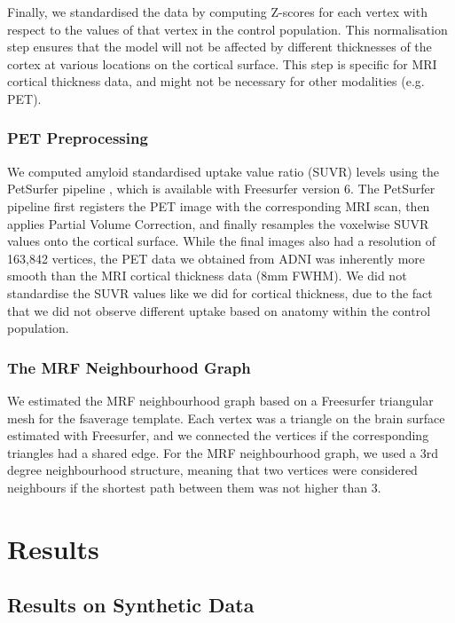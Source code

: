 Finally, we standardised the data by computing Z-scores for each vertex with respect to the values of that vertex in the control population. This normalisation step ensures that the model will not be affected by different thicknesses of the cortex at various locations on the cortical surface. This step is specific for MRI cortical thickness data, and might not be necessary for other modalities (e.g. PET). 

\subsubsection{PET Preprocessing}

We computed amyloid standardised uptake value ratio (SUVR) levels using the PetSurfer pipeline \cite{greve2014cortical,greve2016different}, which is available with Freesurfer version 6. The PetSurfer pipeline first registers the PET image with the corresponding MRI scan, then applies Partial Volume Correction, and finally resamples the voxelwise SUVR values onto the cortical surface. While the final images also had a resolution of 163,842 vertices, the PET data we obtained from ADNI was inherently more smooth than the MRI cortical thickness data (8mm FWHM). We did not standardise the SUVR values like we did for cortical thickness, due to the fact that we did not observe different uptake based on anatomy within the control population.

\subsubsection{The MRF Neighbourhood Graph}

We estimated the MRF neighbourhood graph based on a Freesurfer triangular mesh for the fsaverage template. Each vertex was a triangle on the brain surface estimated with Freesurfer, and we connected the vertices if the corresponding triangles had a shared edge. For the MRF neighbourhood graph, we used a 3rd degree neighbourhood structure, meaning that two vertices were considered neighbours if the shortest path between them was not higher than 3. 



\section{Results}
\label{sec:diveResults}

\subsection{Results on Synthetic Data}
\label{sec:diveResultsSynth}

